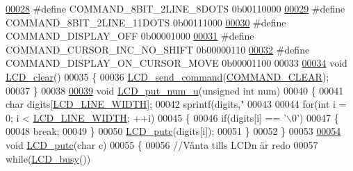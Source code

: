 \begin{DoxyCode}
\hypertarget{_l_c_d_8c_source.tex_l00028}{}\hyperlink{_l_c_d_8c_a28466b08b3aba14d24414842c865917d}{00028} \textcolor{preprocessor}{#define COMMAND\_8BIT\_2LINE\_8DOTS        0b00110000}
\hypertarget{_l_c_d_8c_source.tex_l00029}{}\hyperlink{_l_c_d_8c_a3feb0f4d58db8e05740218b177b0ca45}{00029} \textcolor{preprocessor}{#define COMMAND\_8BIT\_2LINE\_11DOTS       0b00111000}
\hypertarget{_l_c_d_8c_source.tex_l00030}{}\hyperlink{_l_c_d_8c_a0c43cff50d37bd94bbe8e241e740fcbf}{00030} \textcolor{preprocessor}{#define COMMAND\_DISPLAY\_OFF             0b00001000}
\hypertarget{_l_c_d_8c_source.tex_l00031}{}\hyperlink{_l_c_d_8c_a6c7500336a6cbd7b4915c6f546d06701}{00031} \textcolor{preprocessor}{#define COMMAND\_CURSOR\_INC\_NO\_SHIFT     0b00000110 }
\hypertarget{_l_c_d_8c_source.tex_l00032}{}\hyperlink{_l_c_d_8c_a6724b17362a70a197d6e515d15b234f9}{00032} \textcolor{preprocessor}{#define COMMAND\_DISPLAY\_ON\_CURSOR\_MOVE  0b00001100}
00033 
\hypertarget{_l_c_d_8c_source.tex_l00034}{}\hyperlink{_l_c_d_8h_abe38d05e225c701bebf5a61201331a85}{00034} \textcolor{keywordtype}{void} \hyperlink{_l_c_d_8c_abe38d05e225c701bebf5a61201331a85}{LCD\_clear}()
00035 \{
00036     \hyperlink{_l_c_d_8c_aa6d8c104e37eef62ba3a6046d1333ca6}{LCD\_send\_command}(\hyperlink{_l_c_d_8c_a5d12bd35af7836eba7538bf6e71a050d}{COMMAND\_CLEAR});
00037 \}
00038 
\hypertarget{_l_c_d_8c_source.tex_l00039}{}\hyperlink{_l_c_d_8h_ab7c7379b10d76669edf03099f799b357}{00039} \textcolor{keywordtype}{void} \hyperlink{_l_c_d_8c_ab7c7379b10d76669edf03099f799b357}{LCD\_put\_num\_u}(\textcolor{keywordtype}{unsigned} \textcolor{keywordtype}{int} num)
00040 \{
00041     \textcolor{keywordtype}{char} digits[\hyperlink{_l_c_d_8h_a5bdd8750b215c775f2227262a1934b54}{LCD\_LINE\_WIDTH}];
00042     sprintf(digits,\textcolor{stringliteral}{"%
00043     
00044     \textcolor{keywordflow}{for}(\textcolor{keywordtype}{int} i = 0; i < \hyperlink{_l_c_d_8h_a5bdd8750b215c775f2227262a1934b54}{LCD\_LINE\_WIDTH}; ++i)
00045     \{
00046         \textcolor{keywordflow}{if}(digits[i] == \textcolor{charliteral}{'\(\backslash\)0'})
00047         \{
00048             \textcolor{keywordflow}{break};
00049         \}
00050         \hyperlink{_l_c_d_8c_a7a19aaec7f9deb1589a7efddf3da8d3f}{LCD\_putc}(digits[i]);
00051     \}
00052 \}
00053 
\hypertarget{_l_c_d_8c_source.tex_l00054}{}\hyperlink{_l_c_d_8h_a7a19aaec7f9deb1589a7efddf3da8d3f}{00054} \textcolor{keywordtype}{void} \hyperlink{_l_c_d_8c_a7a19aaec7f9deb1589a7efddf3da8d3f}{LCD\_putc}(\textcolor{keywordtype}{char} c)
00055 \{
00056     \textcolor{comment}{//Vänta tills LCDn är redo}
00057     \textcolor{keywordflow}{while}(\hyperlink{_l_c_d_8c_a6679ea6f481524d1b6a30c4d99b8aad5}{LCD\_busy}())
}
\end{DoxyCode}
